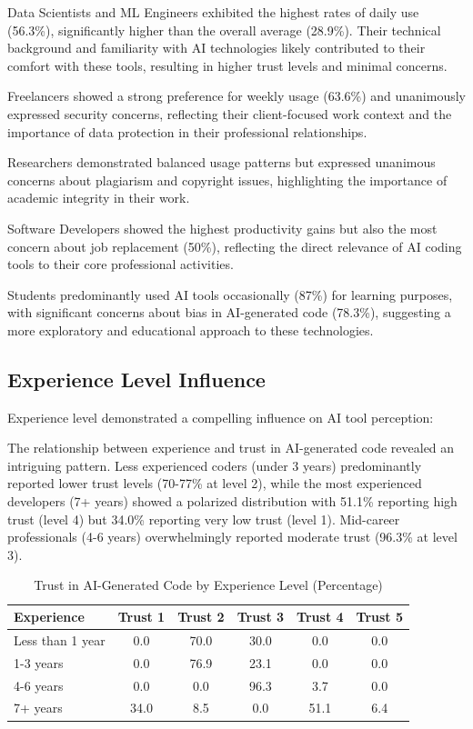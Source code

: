 \documentclass[conference]{IEEEtran}
\begin{document}
Data Scientists and ML Engineers exhibited the highest rates of daily use (56.3\%), significantly higher than the overall average (28.9\%). Their technical background and familiarity with AI technologies likely contributed to their comfort with these tools, resulting in higher trust levels and minimal concerns.

Freelancers showed a strong preference for weekly usage (63.6\%) and unanimously expressed security concerns, reflecting their client-focused work context and the importance of data protection in their professional relationships.

Researchers demonstrated balanced usage patterns but expressed unanimous concerns about plagiarism and copyright issues, highlighting the importance of academic integrity in their work.

Software Developers showed the highest productivity gains but also the most concern about job replacement (50\%), reflecting the direct relevance of AI coding tools to their core professional activities.

Students predominantly used AI tools occasionally (87\%) for learning purposes, with significant concerns about bias in AI-generated code (78.3\%), suggesting a more exploratory and educational approach to these technologies.

\subsection{Experience Level Influence}
Experience level demonstrated a compelling influence on AI tool perception:

The relationship between experience and trust in AI-generated code revealed an intriguing pattern. Less experienced coders (under 3 years) predominantly reported lower trust levels (70-77\% at level 2), while the most experienced developers (7+ years) showed a polarized distribution with 51.1\% reporting high trust (level 4) but 34.0\% reporting very low trust (level 1). Mid-career professionals (4-6 years) overwhelmingly reported moderate trust (96.3\% at level 3).

\begin{table}[H]
    \caption{Trust in AI-Generated Code by Experience Level (Percentage)}
    \centering
    \begin{tabular}{lccccc}
        \toprule
        \textbf{Experience} & \textbf{Trust 1} & \textbf{Trust 2} & \textbf{Trust 3} & \textbf{Trust 4} & \textbf{Trust 5} \\
        \midrule
        Less than 1 year & 0.0 & 70.0 & 30.0 & 0.0 & 0.0 \\
        1-3 years & 0.0 & 76.9 & 23.1 & 0.0 & 0.0 \\
        4-6 years & 0.0 & 0.0 & 96.3 & 3.7 & 0.0 \\
        7+ years & 34.0 & 8.5 & 0.0 & 51.1 & 6.4 \\
        \bottomrule
    \end{tabular}
    \label{tab:experience_trust}
\end{table}
\end{document}
